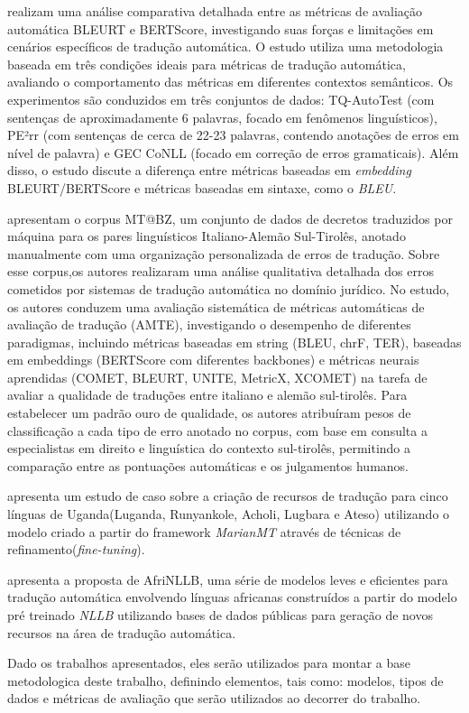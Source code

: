 \cite{mukherjee2025detailed} realizam uma análise comparativa detalhada entre as métricas de avaliação automática BLEURT e BERTScore, investigando suas forças e limitações em cenários específicos de tradução automática. O estudo utiliza uma metodologia baseada em três condições ideais para métricas de tradução automática, avaliando o comportamento das métricas em diferentes contextos semânticos. Os experimentos são conduzidos em três conjuntos de dados: TQ-AutoTest (com sentenças de aproximadamente 6 palavras, focado em fenômenos linguísticos), PE²rr (com sentenças de cerca de 22-23 palavras, contendo anotações de erros em nível de palavra) e GEC CoNLL (focado em correção de erros gramaticais). Além disso, o estudo discute a diferença entre métricas baseadas em \textit{embedding} BLEURT/BERTScore e métricas baseadas em sintaxe, como o \textit{BLEU}.

\cite{di2025meta} apresentam o corpus MT@BZ, um conjunto de dados de decretos traduzidos por máquina para os pares linguísticos Italiano-Alemão Sul-Tirolês, anotado manualmente com uma organização personalizada de erros de tradução. Sobre esse corpus,os autores realizaram uma análise qualitativa detalhada dos erros cometidos por sistemas de tradução automática no domínio jurídico. No estudo, os autores conduzem uma avaliação sistemática de métricas automáticas de avaliação de tradução (AMTE), investigando o desempenho de diferentes paradigmas, incluindo métricas baseadas em string (BLEU, chrF, TER), baseadas em embeddings (BERTScore com diferentes backbones) e métricas neurais aprendidas (COMET, BLEURT, UNITE, MetricX, XCOMET) na tarefa de avaliar a qualidade de traduções entre italiano e alemão sul-tirolês. Para estabelecer um padrão ouro de qualidade, os autores atribuíram pesos de classificação a cada tipo de erro anotado no corpus, com base em consulta a especialistas em direito e linguística do contexto sul-tirolês, permitindo a comparação entre as pontuações automáticas e os julgamentos humanos.

\cite{xu2309paradigm} apresenta um estudo de caso sobre a criação de recursos de tradução para cinco línguas de Uganda(Luganda, Runyankole, Acholi, Lugbara e Ateso) utilizando o modelo criado a partir do framework \textit{MarianMT} através de técnicas de refinamento(\textit{fine-tuning}).

\cite{moslem2026afrinllb} apresenta a proposta de AfriNLLB, uma série de modelos leves e eficientes para tradução automática envolvendo línguas africanas construídos a partir do modelo pré treinado \textit{NLLB} utilizando bases de dados públicas para geração de novos recursos na área de tradução automática.

Dado os trabalhos apresentados, eles serão utilizados para montar a base metodologica deste trabalho, definindo elementos, tais como: modelos, tipos de dados e métricas de avaliação que serão utilizados ao decorrer do trabalho.

